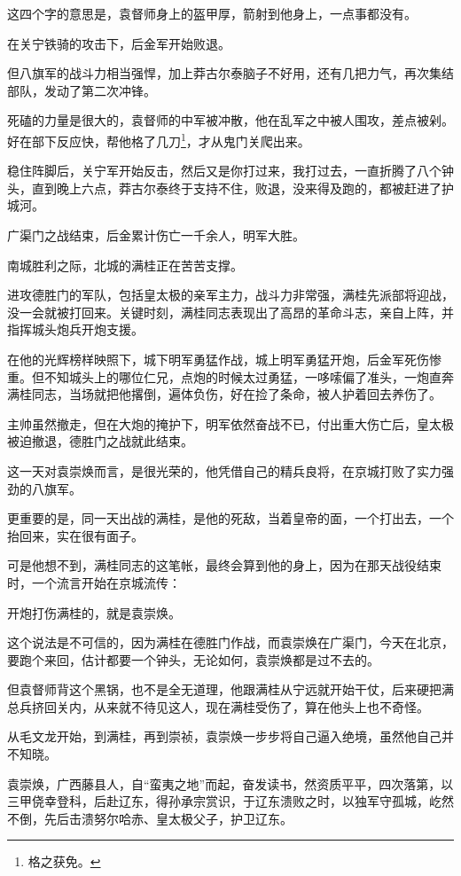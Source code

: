 \begin{multicols}{\theparacolNo}
这四个字的意思是，袁督师身上的盔甲厚，箭射到他身上，一点事都没有。

在关宁铁骑的攻击下，后金军开始败退。

但八旗军的战斗力相当强悍，加上莽古尔泰脑子不好用，还有几把力气，再次集结部队，发动了第二次冲锋。

死磕的力量是很大的，袁督师的中军被冲散，他在乱军之中被人围攻，差点被剁。好在部下反应快，帮他格了几刀\footnote{格之获免。}，才从鬼门关爬出来。

稳住阵脚后，关宁军开始反击，然后又是你打过来，我打过去，一直折腾了八个钟头，直到晚上六点，莽古尔泰终于支持不住，败退，没来得及跑的，都被赶进了护城河。

广渠门之战结束，后金累计伤亡一千余人，明军大胜。

南城胜利之际，北城的满桂正在苦苦支撑。

进攻德胜门的军队，包括皇太极的亲军主力，战斗力非常强，满桂先派部将迎战，没一会就被打回来。关键时刻，满桂同志表现出了高昂的革命斗志，亲自上阵，并指挥城头炮兵开炮支援。

在他的光辉榜样映照下，城下明军勇猛作战，城上明军勇猛开炮，后金军死伤惨重。但不知城头上的哪位仁兄，点炮的时候太过勇猛，一哆嗦偏了准头，一炮直奔满桂同志，当场就把他撂倒，遍体负伤，好在捡了条命，被人护着回去养伤了。

主帅虽然撤走，但在大炮的掩护下，明军依然奋战不已，付出重大伤亡后，皇太极被迫撤退，德胜门之战就此结束。

这一天对袁崇焕而言，是很光荣的，他凭借自己的精兵良将，在京城打败了实力强劲的八旗军。

更重要的是，同一天出战的满桂，是他的死敌，当着皇帝的面，一个打出去，一个抬回来，实在很有面子。

可是他想不到，满桂同志的这笔帐，最终会算到他的身上，因为在那天战役结束时，一个流言开始在京城流传：

开炮打伤满桂的，就是袁崇焕。

这个说法是不可信的，因为满桂在德胜门作战，而袁崇焕在广渠门，今天在北京，要跑个来回，估计都要一个钟头，无论如何，袁崇焕都是过不去的。

但袁督师背这个黑锅，也不是全无道理，他跟满桂从宁远就开始干仗，后来硬把满总兵挤回关内，从来就不待见这人，现在满桂受伤了，算在他头上也不奇怪。

从毛文龙开始，到满桂，再到崇祯，袁崇焕一步步将自己逼入绝境，虽然他自己并不知晓。

袁崇焕，广西藤县人，自“蛮夷之地”而起，奋发读书，然资质平平，四次落第，以三甲侥幸登科，后赴辽东，得孙承宗赏识，于辽东溃败之时，以独军守孤城，屹然不倒，先后击溃努尔哈赤、皇太极父子，护卫辽东。


\end{multicols}
